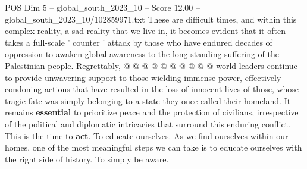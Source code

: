 \begin{textsample}{POS Dim 5 – global\_south\_2023\_10 – Score 12.00 – global\_south\_2023\_10/102859971.txt}
These are difficult times, and within this complex reality, a sad reality that we live in, it becomes evident that it often takes a full-scale ' counter ' attack by those who have endured decades of oppression to awaken global awareness to the long-standing suffering of the Palestinian people.
Regrettably, @ @ @ @ @ @ @ @ @ @ world leaders continue to provide unwavering support to those wielding immense power, effectively condoning actions that have resulted in the loss of innocent lives of those, whose tragic fate was simply belonging to a state they once called their homeland.
It remains \textbf{essential} to prioritize peace and the protection of civilians, irrespective of the political and diplomatic intricacies that surround this enduring conflict.
This is the time to \textbf{act}.
To educate ourselves.
As we find ourselves within our homes, one of the most meaningful steps we can take is to educate ourselves with the right side of history.
To simply be aware.

\end{textsample}
